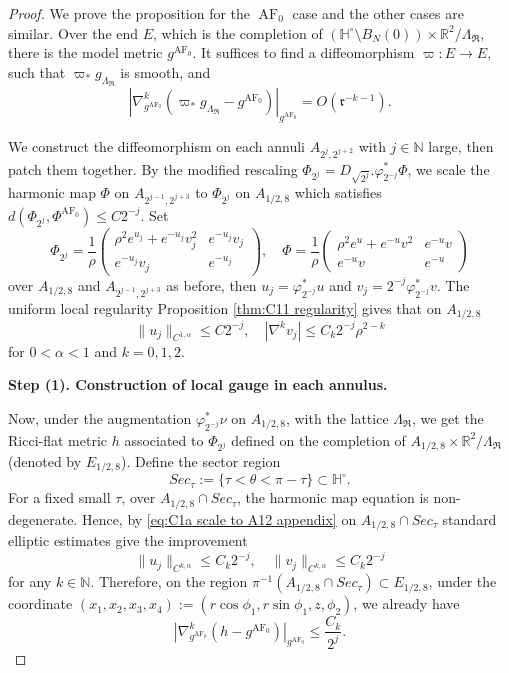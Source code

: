 \documentclass[10pt,a4paper]{amsart}
\DeclareMathOperator{\AF}{AF}
\newcommand{\mR} {\mathfrak R}
\begin{document}
\begin{proof}
    We prove the proposition for the $\AF_0$ case and the other cases are similar. Over the end $E$, which is the completion of $(\mathbb{H}^\circ\setminus B_N(0))\times\mathbb{R}^2/\Lambda_\mR$, there is the model metric $g^{\AF_0}$. It suffices to find a diffeomorphism $\varpi:E\to E$, such that $\varpi_*g_{\Lambda_\mR}$ is smooth, and 
    $$|\nabla_{g^{\AF_0}}^k(\varpi_*g_{\Lambda_{\mR}}-g^{\AF_0})|_{g^{\AF_0}}=O(\mathfrak{r}^{-k-1}).$$

    We construct the diffeomorphism on each annuli $A_{2^{j},2^{j+2}}$ with $j\in\mathbb{N}$ large, then patch them together. By the modified rescaling $\Phi_{2^j}=D_{\sqrt{2^j}}.\varphi_{2^{-j}}^*\Phi$, we scale the harmonic map $\Phi$ on $A_{2^{j-1},2^{j+3}}$ to $\Phi_{2^j}$ on $A_{1/2,8}$ which satisfies $d(\Phi_{2^j},\Phi^{\AF_0})\leq C2^{-j}$. Set
    $$\Phi_{2^j}=\frac{1}{\rho}\left(\begin{matrix}
        \rho^2e^{u_j}+e^{-u_j}v_j^2 & e^{-u_j}v_j \\ e^{-u_j}v_j & e^{-u_j} 
    \end{matrix}\right),\quad \Phi=\frac{1}{\rho}\left(\begin{matrix}
        \rho^2e^{u}+e^{-u}v^2 & e^{-u}v \\ e^{-u}v & e^{-u} 
    \end{matrix}\right)$$
    over $A_{1/2,8}$ and $A_{2^{j-1},2^{j+3}}$ as before, then $u_j=\varphi_{2^{-j}}^*u$ and $v_j=2^{-j}\varphi_{2^{-j}}^*v$. The uniform local regularity Proposition \ref{thm:C11 regularity} gives that on $A_{1/2,8}$
    \begin{equation}\label{eq:C1a scale to A12 appendix}
        \|u_j\|_{C^{1,\alpha}}\leq C2^{-j},\quad |\nabla^kv_j|\leq C_k2^{-j}\rho^{2-k}
    \end{equation}
    for $0<\alpha<1$ and $k=0,1,2$. 


    \vspace{10pt}
    \noindent\textbf{Step (1). Construction of local gauge in each annulus.}
    \vspace{10pt}


    

    Now, under the augmentation $\varphi_{2^{-j}}^*\nu$ on $A_{1/2,8}$, with the lattice $\Lambda_{\mR}$, we get  the Ricci-flat metric $h$ associated to $\Phi_{2^j}$ defined on the completion of $A_{1/2,8}\times\mathbb{R}^2/\Lambda_{\mR}$ (denoted by $E_{1/2,8}$).  Define the sector region
    $$Sec_\tau:=\{\tau<\theta<\pi-\tau\}\subset\mathbb{H}^\circ.$$
    For a fixed small $\tau$, over $A_{1/2,8}\cap Sec_\tau$, the harmonic map equation is non-degenerate. Hence, by \eqref{eq:C1a scale to A12 appendix} on $A_{1/2,8}\cap Sec_\tau$ standard elliptic estimates give the improvement 
    \begin{equation}
        \|u_j\|_{C^{k,\alpha}}\leq C_k2^{-j},\quad \|v_j\|_{C^{k,\alpha}}\leq C_k2^{-j}
    \end{equation}
    for any $k\in\mathbb{N}$. Therefore, on the region $\pi^{-1}(A_{1/2,8}\cap Sec_\tau)\subset E_{1/2,8}$, under the coordinate $(x_1,x_2,x_3,x_4):=(r\cos\phi_1,r\sin\phi_1,z,\phi_2)$, we already have
    $$|\nabla_{g^{\AF_0}}^k(h-g^{\AF_0})|_{g^{\AF_0}}\leq \frac{C_k}{2^j}.$$
    

\end{proof}
\end{document}
